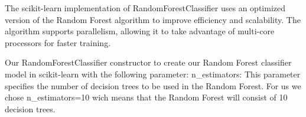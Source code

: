 The scikit-learn implementation of RandomForestClassifier uses an optimized version of the Random Forest algorithm to improve efficiency and scalability.
The algorithm supports parallelism, allowing it to take advantage of multi-core processors for faster training.

Our RandomForestClassifier constructor to create our Random Forest classifier model in scikit-learn with the following parameter:
n\_estimators: This parameter specifies the number of decision trees to be used in the Random Forest. For us we chose n\_estimators=10 wich means that the Random Forest will consist of 10 decision trees.
